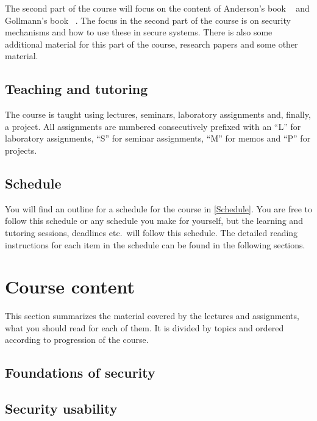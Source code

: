 The second part of the course will focus on the content of Anderson's book 
~\cite{Anderson2008sea} and Gollmann's book 
~\cite{Gollmann2011cs}.
The focus in the second part of the course is on security mechanisms and how to 
use these in secure systems.
There is also some additional material for this part of the course, \eg 
research papers and some other material.

\subsection{Teaching and tutoring}

The course is taught using lectures, seminars, laboratory assignments and, 
finally, a project.
All assignments are numbered consecutively prefixed with an \enquote{L} for 
laboratory assignments, \enquote{S} for seminar assignments, \enquote{M} for 
memos and \enquote{P} for projects.

\subsection{Schedule}

You will find an outline for a schedule for the course in \cref{Schedule}.
You are free to follow this schedule or any schedule you make for yourself, but 
the learning and tutoring sessions, deadlines etc.\ will follow this schedule.
The detailed reading instructions for each item in the schedule can be found in 
the following sections.




\section{Course content}

This section summarizes the material covered by the lectures and assignments, 
\ie what you should read for each of them.
It is divided by topics and ordered according to progression of the course.

\subsection{Foundations of security}


\subsection{Security usability}


